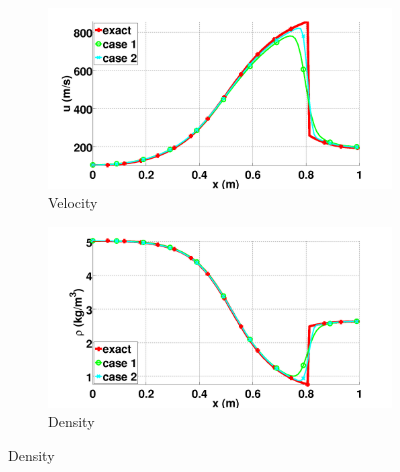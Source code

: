 \documentclass[preprint,10pt]{elsarticle}
\begin{document}
%
\begin{figure}[H]
        \centering
        \begin{subfigure}[b]{0.5\textwidth}
                \centering
                \includegraphics[width=\textwidth]{figures/vapor_velocity_llf_and_exact_100.png}
                \caption{Velocity}
                \label{fig:vap-phase-vel}
        \end{subfigure}%
        \begin{subfigure}[b]{0.5\textwidth}
                \centering
                \includegraphics[width=\textwidth]{figures/vapor_density_llf_and_exact_100.png}
                \caption{Density}
                \label{fig:vap-phase-density}
        \end{subfigure}
        

\end{figure}
\end{document}
